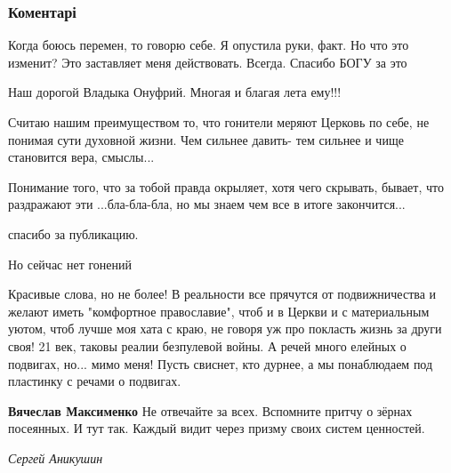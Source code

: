  
 
 
 
 
\subsubsection{Коментарі}
\label{sec:30_09_2021.fb.karamazov_oleg.1.cerkov_gonenia.cmt}

\begin{itemize} %

Когда боюсь перемен, то говорю себе. Я опустила руки, факт. Но что это изменит?
Это заставляет меня действовать. Всегда. Спасибо БОГУ за это

Наш дорогой Владыка Онуфрий. Многая и благая лета ему!!!


Считаю нашим преимуществом то, что гонители меряют Церковь по себе, не понимая
сути духовной жизни. Чем сильнее давить- тем сильнее и чище становится вера,
смыслы...

Понимание того, что за тобой правда окрыляет, хотя чего скрывать, бывает, что
раздражают эти ...бла-бла-бла, но мы знаем чем все в итоге закончится...

спасибо за публикацию.

Но сейчас нет гонений


Красивые слова, но не более! В реальности все прячутся от подвижничества и
желают иметь "комфортное православие", чтоб и в Церкви и с материальным уютом,
чтоб лучше моя хата с краю, не говоря уж про покласть жизнь за други своя! 21
век, таковы реалии безпулевой войны. А речей много елейных о подвигах, но...
мимо меня! Пусть свиснет, кто дурнее, а мы понаблюдаем под пластинку с речами о
подвигах.

\begin{itemize} %
\textbf{Вячеслав Максименко} Не отвечайте за всех. Вспомните притчу о зёрнах посеянных. И тут так. Каждый видит через призму своих систем ценностей.
\end{itemize} %

\emph{Сергей Аникушин}


\end{itemize}
